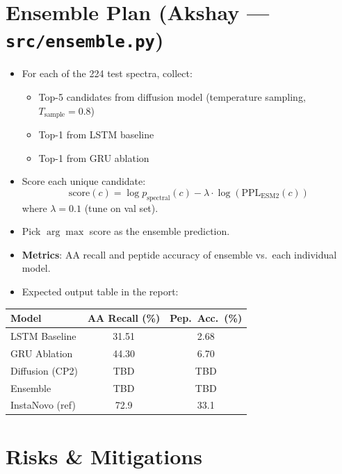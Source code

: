 \documentclass[11pt,letterpaper]{article}
\begin{document}
\section{Ensemble Plan (Akshay --- \texttt{src/ensemble.py})}

\begin{itemize}
  \item For each of the 224 test spectra, collect:
    \begin{itemize}
      \item Top-5 candidates from diffusion model (temperature sampling, $T_\text{sample} = 0.8$)
      \item Top-1 from LSTM baseline
      \item Top-1 from GRU ablation
    \end{itemize}
  \item Score each unique candidate:
    \[ \text{score}(c) = \log p_\text{spectral}(c) - \lambda \cdot \log(\text{PPL}_\text{ESM2}(c)) \]
    where $\lambda = 0.1$ (tune on val set).
  \item Pick $\arg\max$ score as the ensemble prediction.
  \item \textbf{Metrics}: AA recall and peptide accuracy of ensemble vs.\ each individual model.
  \item Expected output table in the report:
\end{itemize}

\begin{center}
\begin{tabular}{lcc}
\toprule
\textbf{Model} & \textbf{AA Recall (\%)} & \textbf{Pep.\ Acc.\ (\%)} \\
\midrule
LSTM Baseline  & 31.51 & 2.68 \\
GRU Ablation   & 44.30 & 6.70 \\
Diffusion (CP2) & TBD  & TBD  \\
Ensemble        & TBD  & TBD  \\
InstaNovo (ref) & 72.9 & 33.1 \\
\bottomrule
\end{tabular}
\end{center}

\section{Risks \& Mitigations}
\end{document}
